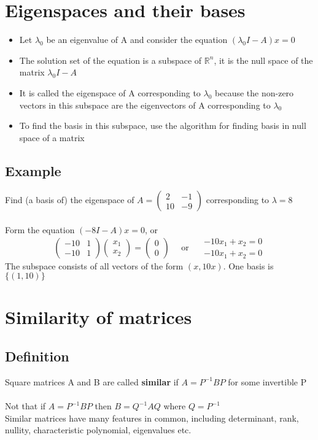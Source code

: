 \documentclass{article}[18pt]
\begin{document}
\section{Eigenspaces and their bases}
\begin{itemize}
	\item Let $\lambda_0$ be an eigenvalue of A and consider the equation $(\lambda_0I-A)x=0$
	\item The solution set of the equation is a subspace of $\mathbb{R}^n$, it is the null space of the matrix $\lambda_0I-A$
	\item It is called the eigenspace of A corresponding to $\lambda_0$ because the non-zero vectors in this subspace are the eigenvectors of A corresponding to $\lambda_0$
	\item To find the basis in this subspace, use the algorithm for finding basis in null space of a matrix
\end{itemize}
\subsection{Example}
Find (a basis of) the eigenspace of $A=\left( \begin{array}{cc}{2} & {-1} \\ {10} & {-9}\end{array}\right)$ corresponding to $\lambda=8$\\
\\
Form the equation $(-8I-A)x=0$, or
\[ 
\left( \begin{array}{cc}{-10} & {1} \\ {-10} & {1}\end{array}\right) \left( \begin{array}{c}{x_{1}} \\ {x_{2}}\end{array}\right)=\left( \begin{array}{c}{0} \\ {0}\end{array}\right) \quad \text { or } \quad \begin{array}{c}{-10 x_{1}+x_{2}=0} \\ {-10 x_{1}+x_{2}=0}\end{array}
\]
The subspace consists of all vectors of the form $(x,10x)$. One basis is $\{(1,10)\}$
\section{Similarity of matrices}
\subsection{Definition}
Square matrices A and B are called \textbf{similar} if $A=P^{-1}BP$ for some invertible P\\
\\
Not that if $A=P^{-1}BP$ then $B=Q^{-1}AQ$ where $Q=P^{-1}$\\
Similar matrices have many features in common, including determinant, rank, nullity, characteristic polynomial, eigenvalues etc.
\end{document}
